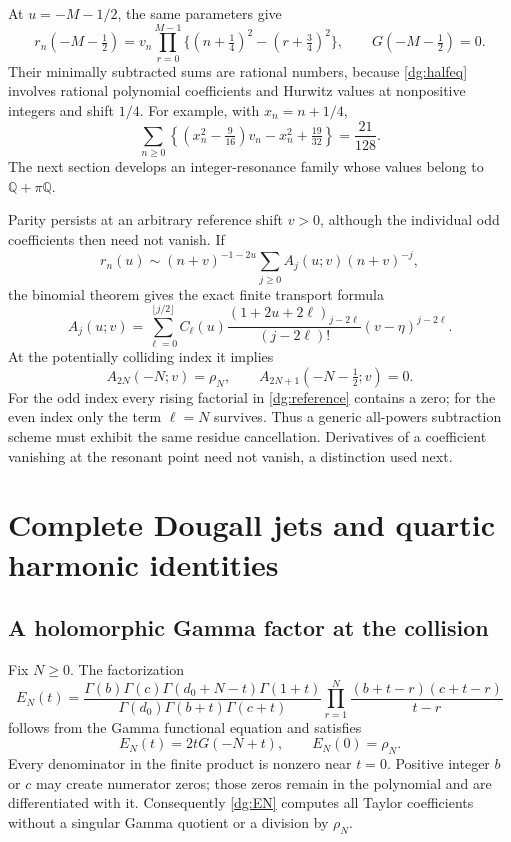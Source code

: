 \documentclass[11pt,a4paper]{article}
\numberwithin{equation}{section}
\theoremstyle{definition}
\theoremstyle{remark}
\newcommand{\Q}{\mathbb Q}
\begin{document}
At $u=-M-1/2$, the same parameters give
\[
 r_n(-M-\tfrac12)=v_n\prod_{r=0}^{M-1}
           \{(n+\tfrac14)^2-(r+\tfrac34)^2\},\qquad
 G(-M-\tfrac12)=0.
\]
Their minimally subtracted sums are rational numbers, because
\eqref{dg:halfeq} involves rational polynomial coefficients and
Hurwitz values at nonpositive integers and shift $1/4$. For example,
with $x_n=n+1/4$,
\begin{equation}\label{dg:binomialsquareN1}
 \sum_{n\ge0}\left\{(x_n^2-\tfrac9{16})v_n-x_n^2+\tfrac{19}{32}\right\}
 =\frac{21}{128}.
\end{equation}
The next section develops an integer-resonance family whose values
belong to $\Q+\pi\Q$.

Parity persists at an arbitrary reference shift $v>0$, although the
individual odd coefficients then need not vanish. If
\[
 r_n(u)\sim(n+v)^{-1-2u}\sum_{j\ge0}A_j(u;v)(n+v)^{-j},
\]
the binomial theorem gives the exact finite transport formula
\begin{equation}\label{dg:reference}
 A_j(u;v)=\sum_{\ell=0}^{\lfloor j/2\rfloor}
 C_\ell(u)\frac{(1+2u+2\ell)_{j-2\ell}}{(j-2\ell)!}
                       (v-\eta)^{j-2\ell}.
\end{equation}
At the potentially colliding index it implies
\begin{equation}\label{dg:parityresidue}
 A_{2N}(-N;v)=\rho_N,\qquad
 A_{2N+1}(-N-\tfrac12;v)=0.
\end{equation}
For the odd index every rising factorial in \eqref{dg:reference}
contains a zero; for the even index only the term $\ell=N$ survives.
Thus a generic all-powers subtraction scheme must exhibit the same
residue cancellation. Derivatives of a coefficient vanishing at the
resonant point need not vanish, a distinction used next.


\section{Complete Dougall jets and quartic harmonic identities}
\label{dg:jetssection}

\subsection{A holomorphic Gamma factor at the collision}
Fix $N\ge0$. The factorization
\begin{equation}\label{dg:EN}
 E_N(t)=
 \frac{\Gamma(b)\Gamma(c)\Gamma(d_0+N-t)\Gamma(1+t)}
 {\Gamma(d_0)\Gamma(b+t)\Gamma(c+t)}
 \prod_{r=1}^{N}\frac{(b+t-r)(c+t-r)}{t-r}
\end{equation}
follows from the Gamma functional equation and satisfies
\begin{equation}\label{dg:ENidentity}
 E_N(t)=2tG(-N+t),\qquad E_N(0)=\rho_N.
\end{equation}
Every denominator in the finite product is nonzero near $t=0$.
Positive integer $b$ or $c$ may create numerator zeros; those zeros
remain in the polynomial and are differentiated with it. Consequently
\eqref{dg:EN} computes all Taylor coefficients without a singular
Gamma quotient or a division by $\rho_N$.
\end{document}
